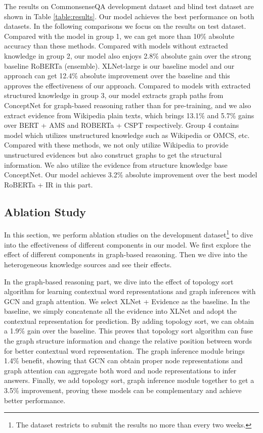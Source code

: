 \documentclass[letterpaper]{article} \usepackage{aaai20}  \usepackage{times}  \usepackage{helvet} \usepackage{courier}  \usepackage[hyphens]{url}  \usepackage{graphicx} \urlstyle{rm} \def\UrlFont{\rm}  \usepackage{graphicx}  \frenchspacing  \setlength{\pdfpagewidth}{8.5in}  \setlength{\pdfpageheight}{11in}
\begin{document}
The results on CommonsenseQA development dataset and blind test dataset are shown in Table \ref{table:results}. Our model achieves the best performance on both datasets. In the following comparisons we focus on the results on test dataset. Compared with the model in group 1, we can get more than  10\% absolute accuracy than these methods. Compared with models without extracted knowledge in group 2, our model also enjoys 2.8\% absolute gain over the strong baseline RoBERTa (ensemble). XLNet-large is our baseline model and our approach can get 12.4\% absolute improvement over the baseline and this approves the effectiveness of our approach. Compared to models with extracted structured knowledge in group 3, our model extracts graph paths from ConceptNet for graph-based reasoning rather than for pre-training, and we also extract evidence from Wikipedia plain texts, which brings 13.1\% and 5.7\% gains over BERT + AMS and ROBERTa + CSPT respectively. Group 4 contains model which utilizes unstructured knowledge such as Wikipedia or OMCS, etc. Compared with these methods, we not only utilize Wikipedia to provide unstructured evidences but also construct graphs to get the structural information. We also utilize the evidence from structure knowledge base ConceptNet. Our model achieves 3.2\% absolute improvement over the best model RoBERTa + IR in this part.

\subsection{Ablation Study}
In this section, we perform ablation studies on the development dataset\footnote{The dataset restricts to submit the results no more than every two weeks.} to dive into the effectiveness of different components in our model. 
We first explore the effect of different components in graph-based reasoning. Then we dive into the heterogeneous knowledge sources and see their effects. 

In the graph-based reasoning part, we dive into the effect of topology sort algorithm for learning contextual word representations and graph inferences with GCN and graph attention. We select XLNet + Evidence as the baseline. In the baseline, we simply concatenate all the evidence into XLNet and adopt the contextual representation for prediction. By adding topology sort, we can obtain a 1.9\% gain over the baseline. This proves that topology sort algorithm can fuse the graph structure information and change the relative position between words for better contextual word representation. The graph inference module brings 1.4\% benefit, showing that GCN can obtain proper node representations and graph attention can aggregate both word and node representations to infer answers. Finally, we add topology sort, graph inference module together to get a 3.5\% improvement, proving these models can be complementary and achieve better performance.
    
\end{document}
